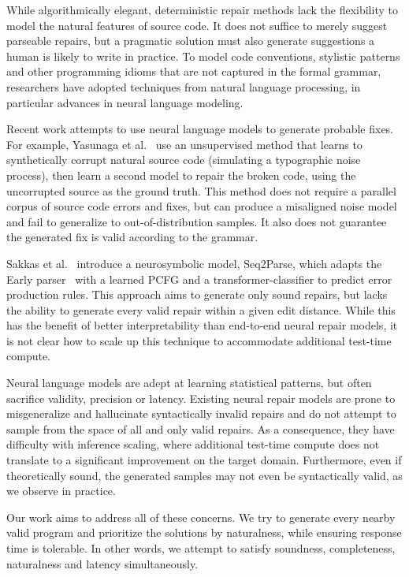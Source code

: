 While algorithmically elegant, deterministic repair methods lack the flexibility to model the natural features of source code. It does not suffice to merely suggest parseable repairs, but a pragmatic solution must also generate suggestions a human is likely to write in practice. To model code conventions, stylistic patterns and other programming idioms that are not captured in the formal grammar, researchers have adopted techniques from natural language processing, in particular advances in neural language modeling.

Recent work attempts to use neural language models to generate probable fixes. For example, Yasunaga et al.~\cite{yasunaga2021break} use an unsupervised method that learns to synthetically corrupt natural source code (simulating a typographic noise process), then learn a second model to repair the broken code, using the uncorrupted source as the ground truth. This method does not require a parallel corpus of source code errors and fixes, but can produce a misaligned noise model and fail to generalize to out-of-distribution samples. It also does not guarantee the generated fix is valid according to the grammar.

Sakkas et al.~\cite{sakkas2022seq2parse} introduce a neurosymbolic model, Seq2Parse, which adapts the Early parser~\cite{earley1970efficient} with a learned PCFG and a transformer-classifier to predict error production rules. This approach aims to generate only sound repairs, but lacks the ability to generate every valid repair within a given edit distance. While this has the benefit of better interpretability than end-to-end neural repair models, it is not clear how to scale up this technique to accommodate additional test-time compute.

Neural language models are adept at learning statistical patterns, but often sacrifice validity, precision or latency. Existing neural repair models are prone to misgeneralize and hallucinate syntactically invalid repairs and do not attempt to sample from the space of all and only valid repairs. As a consequence, they have difficulty with inference scaling, where additional test-time compute does not translate to a significant improvement on the target domain. Furthermore, even if theoretically sound, the generated samples may not even be syntactically valid, as we observe in practice.

Our work aims to address all of these concerns. We try to generate every nearby valid program and prioritize the solutions by naturalness, while ensuring response time is tolerable. In other words, we attempt to satisfy soundness, completeness, naturalness and latency simultaneously.

